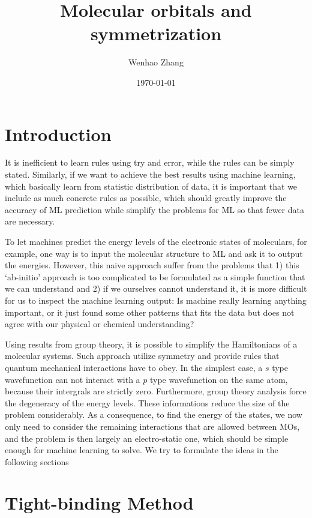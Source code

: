 \documentclass{article}
\begin{document}
\title{Molecular orbitals and symmetrization}
\author{Wenhao Zhang}
\date{\today}
\maketitle

\section{Introduction}

It is inefficient to learn rules using try and error, while the rules can be 
simply stated. 
Similarly, if we want to achieve the best results using machine learning, which 
basically learn from statistic distribution of data, 
it is important that we include as much concrete rules as possible,
which should greatly improve the accuracy of ML prediction while simplify the 
problems for ML so that fewer data are necessary.

To let machines predict the energy levels of the electronic states of moleculars, for example,
one way is to input the molecular structure to ML and ask it to output the energies. 
However, this naive approach suffer from the problems that 1) this `ab-initio' approach
is too complicated to be formulated as a simple function that we can understand 
and 2) if we ourselves cannot understand it, it is more difficult for us to inspect the 
machine learning output: Is machine really learning anything important, or it just 
found some other patterns that fits the data but does not agree with our physical 
or chemical understanding?

Using results from group theory, it is possible to simplify the Hamiltonians of 
a molecular systems. Such approach utilize symmetry and provide
rules that quantum mechanical interactions have to obey. 
In the simplest case, a $s$ type wavefunction can not interact with a $p$ type wavefunction on the 
same atom, because their intergrals are strictly zero. 
Furthermore, group theory analysis force the degeneracy of the energy levels.
These informations reduce the size of the problem considerably. As a consequence, to 
find the energy of the states, we now only need to consider the remaining interactions 
that are allowed between MOs, and the problem is then largely 
an electro-static one, which should be simple enough for machine learning to solve.
We try to formulate the ideas in the following sections

\section{Tight-binding Method}
\end{document}
